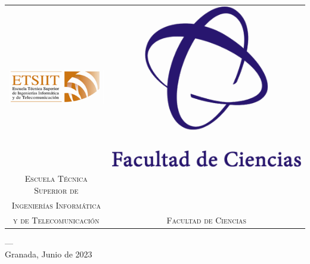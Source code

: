 \begin{titlepage}
\begin{minipage}{\textwidth}
\begin{tabular}{c c}
\includegraphics[scale=1]{imagenes/etsiit_logo.png} & \includegraphics[scale=0.2]{imagenes/ciencias_logo.png}\\
\textsc{Escuela Técnica Superior de}\\\textsc{Ingenierías Informática}\\\textsc{y de Telecomunicación} & \textsc{Facultad de Ciencias} \\
\end{tabular} 

\textsc{---}\\
Granada, Junio de 2023
\end{minipage}
\end{titlepage}


